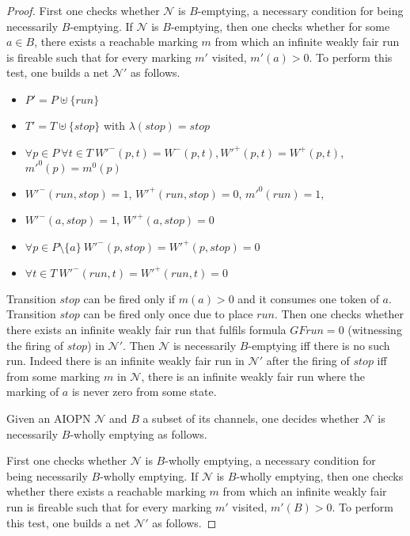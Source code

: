 \begin{proof}
\noindent First one checks whether $\mathcal N$ is $B$-emptying,
a necessary condition for being necessarily $B$-emptying. 
If $\mathcal N$ is $B$-emptying, then one checks whether
for some $a \in B$, there exists a reachable marking $m$ from which an infinite weakly fair run 
is fireable such that for every marking $m'$ visited, $m'(a)>0$. To perform
this test, one builds a net $\mathcal N'$ as follows.

\begin{itemize}
%
	\item $P'=P\uplus \{run\}$
%
	\item $T'=T\uplus \{stop\}$ with $\lambda(stop)=stop$
%
	\item $\forall p \in P\ \forall t \in T\ W'^-(p,t)=W^-(p,t), W'^+(p,t)=W^+(p,t)$, $m'^0(p)=m^0(p)$
%
	\item $W'^-(run,stop)=1$, $W'^+(run,stop)=0$, $m'^0(run)=1$,
%
	\item $W'^-(a,stop)=1$, $W'^+(a,stop)=0$
%
	\item $\forall p \in P \setminus \{a\}\  W'^-(p,stop)=W'^+(p,stop)=0$
%
	\item $\forall t \in T\  W'^-(run,t)=W'^+(run,t)=0$
%
\end{itemize}

Transition $stop$ can be fired only if $m(a)>0$ and it consumes one token of $a$.
Transition $stop$ can be fired only once due to place $run$.
Then one checks whether there exists an infinite weakly fair run 
that fulfils formula $GF run=0$ (witnessing the firing of $stop$) in
$\mathcal N'$. 
Then $\mathcal N$ is necessarily $B$-emptying 
iff there is no such run. 
Indeed there is an infinite weakly fair run in $\mathcal N'$
after the firing of $stop$ iff from some marking $m$ in $\mathcal N$,
there is an infinite weakly fair run where the marking of $a$ is never zero
from some state.

\smallskip{}
Given an AIOPN $\mathcal N$ and $B$ a subset of its channels, one
decides whether $\mathcal N$ is necessarily $B$-wholly emptying as follows.

\noindent First one checks whether $\mathcal N$ is $B$-wholly emptying,
a necessary condition for being necessarily $B$-wholly emptying. 
If $\mathcal N$ is $B$-wholly emptying, then one checks whether
there exists a reachable marking $m$ from which an infinite
weakly fair run is fireable such that for every marking $m'$ visited, $m'(B)>0$. To perform
this test, one builds a net $\mathcal N'$ as follows. 


\end{proof}
